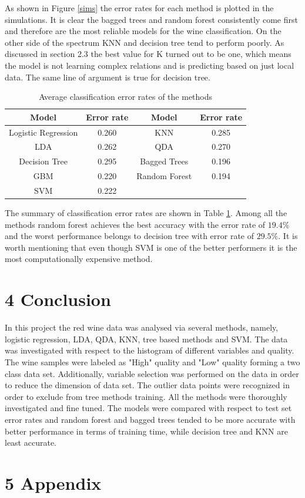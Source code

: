 \documentclass{article}
\begin{document}
\vspace{0.5cm}
As shown in Figure \ref{sims} the error rates for each method is plotted in the simulations. It is clear the bagged trees and random forest consistently come first and therefore are the most reliable models for the wine classification. On the other side of the spectrum KNN and decision tree tend to perform poorly. As discussed in section 2.3 the best value for K turned out to be one, which means the model is not learning complex relations and is predicting based on just local data. The same line of argument is true for decision tree.

\begin{table}[H]
    \centering
    \begin{tabular}{c|c|| c|c}
    \hline
        Model & Error rate & Model & Error rate\\
        \hline
        \hline
        Logistic Regression & 0.260 &KNN & 0.285\\
        LDA & 0.262 & QDA & 0.270 \\
         \cellcolor{red!30}Decision Tree &  \cellcolor{red!30}0.295 & Bagged Trees &0.196\\
        GBM & 0.220 &\cellcolor{green!30} Random Forest &\cellcolor{green!30} 0.194\\
        SVM& 0.222 & & \\
         \hline
    \end{tabular}
    \caption{Average classification error rates of the methods}
    \label{summary}
\end{table}

The summary of classification error rates are shown in Table \ref{summary}. Among all the methods random forest achieves the best accuracy with the error rate of $19.4 \%$ and the worst performance belongs to decision tree with error rate of $29.5 \%$. It is worth mentioning that even though SVM is one of the better performers it is the most computationally expensive method. 

\section{4  Conclusion}
In this project the red wine data was analysed via several methods, namely, logistic regression, LDA, QDA, KNN, tree based methods and SVM. The data was investigated with respect to the histogram of different variables and quality. The wine samples were labeled as "High" quality and "Low" quality forming a two class data set.  Additionally, variable selection was performed on the data in order to reduce the dimension of data set. The outlier data points were recognized in order to exclude from tree methods training. All the methods were thoroughly investigated and fine tuned. The models were compared with respect to test set error rates and random forest and bagged trees tended to be more accurate with better performance in terms of training time, while decision tree and KNN are least accurate.

\newpage
\section{5  Appendix}

\end{document}
